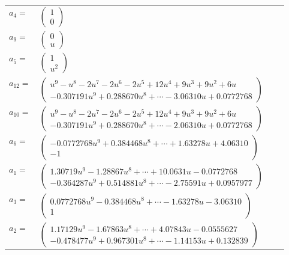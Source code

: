 \documentclass[1p]{elsarticle_modified}
\theoremstyle{definition}
\begin{document}
\begin{tabular}{m{7pt} m{180pt} m{7pt} m{180pt} }
\flushright $a_{4}=$&$\begin{pmatrix}1\\0\end{pmatrix}$ \\
\flushright $a_{9}=$&$\begin{pmatrix}0\\u\end{pmatrix}$ \\
\flushright $a_{5}=$&$\begin{pmatrix}1\\u^2\end{pmatrix}$ \\
\flushright $a_{12}=$&$\begin{pmatrix}u^9- u^8-2 u^7-2 u^6-2 u^5+12 u^4+9 u^3+9 u^2+6 u\\-0.307191 u^{9}+0.288670 u^{8}+\cdots-3.06310 u+0.0772768\end{pmatrix}$ \\
\flushright $a_{10}=$&$\begin{pmatrix}u^9- u^8-2 u^7-2 u^6-2 u^5+12 u^4+9 u^3+9 u^2+6 u\\-0.307191 u^{9}+0.288670 u^{8}+\cdots-2.06310 u+0.0772768\end{pmatrix}$ \\
\flushright $a_{6}=$&$\begin{pmatrix}-0.0772768 u^{9}+0.384468 u^{8}+\cdots+1.63278 u+4.06310\\-1\end{pmatrix}$ \\
\flushright $a_{1}=$&$\begin{pmatrix}1.30719 u^{9}-1.28867 u^{8}+\cdots+10.0631 u-0.0772768\\-0.364287 u^{9}+0.514881 u^{8}+\cdots-2.75591 u+0.0957977\end{pmatrix}$ \\
\flushright $a_{3}=$&$\begin{pmatrix}0.0772768 u^{9}-0.384468 u^{8}+\cdots-1.63278 u-3.06310\\1\end{pmatrix}$ \\
\flushright $a_{2}=$&$\begin{pmatrix}1.17129 u^{9}-1.67863 u^{8}+\cdots+4.07843 u-0.0555627\\-0.478477 u^{9}+0.967301 u^{8}+\cdots-1.14153 u+0.132839\end{pmatrix}$ \\

\end{tabular}
\end{document}
